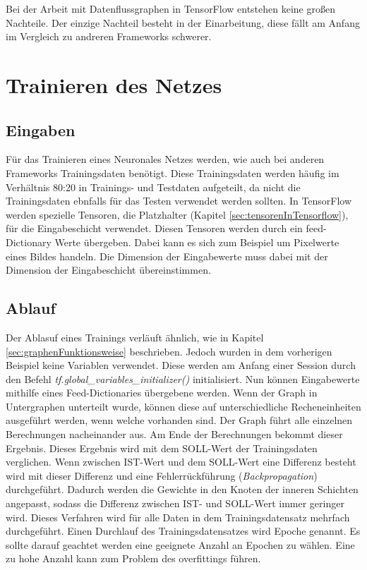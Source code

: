 Bei der Arbeit mit Datenflussgraphen in TensorFlow entstehen keine großen Nachteile. Der einzige Nachteil besteht in der Einarbeitung, diese fällt am Anfang im Vergleich zu andreren Frameworks schwerer.

\section{Trainieren des Netzes}
\label{sec:trainierenDesNetzes}
\printsubchapterauthor{\authorNiklas}
\subsection{Eingaben}
\label{sec:eingaben}
Für das Trainieren eines Neuronales Netzes werden, wie auch bei anderen Frameworks Trainingsdaten benötigt. Diese Trainingsdaten werden häufig im Verhältnis 80:20 in Trainings- und Testdaten aufgeteilt, da nicht die Trainingsdaten ebnfalls für das Testen verwendet werden sollten. In TensorFlow werden spezielle Tensoren, die Platzhalter (Kapitel \ref{sec:tensorenInTensorflow}), für die Eingabeschicht verwendet. Diesen Tensoren werden durch ein feed-Dictionary Werte übergeben. Dabei kann es sich zum Beispiel um Pixelwerte eines Bildes handeln. Die Dimension der Eingabewerte muss dabei mit der Dimension der Eingabeschicht übereinstimmen. 

\subsection{Ablauf}
\label{sec:ablauf}
Der Ablasuf eines Trainings verläuft ähnlich, wie in Kapitel \ref{sec:graphenFunktionsweise} beschrieben. Jedoch wurden in dem vorherigen Beispiel keine Variablen verwendet. Diese werden am Anfang einer Session durch den Befehl \textit{tf.global\_variables\_initializer()} initialisiert. Nun können Eingabewerte mithilfe eines Feed-Dictionaries übergebene werden. Wenn der Graph in Untergraphen unterteilt wurde, können diese auf unterschiedliche Recheneinheiten ausgeführt werden, wenn welche vorhanden sind. Der Graph führt alle einzelnen Berechnungen nacheinander aus. Am Ende der Berechnungen bekommt dieser Ergebnis. Dieses Ergebnis wird mit dem SOLL-Wert der Trainingsdaten verglichen. Wenn zwischen IST-Wert und dem SOLL-Wert eine Differenz besteht wird mit dieser Differenz und eine Fehlerrückführung (\textit{Backpropagation}) durchgeführt. Dadurch werden die Gewichte in den Knoten der inneren Schichten angepasst, sodass die Differenz zwischen IST- und SOLL-Wert immer geringer wird. Dieses Verfahren wird für alle Daten in dem Trainingsdatensatz mehrfach durchgeführt. Einen Durchlauf des Trainingsdatensatzes wird Epoche genannt. Es sollte darauf geachtet werden eine geeignete Anzahl an Epochen zu wählen. Eine zu hohe Anzahl kann zum Problem des overfittings führen.

